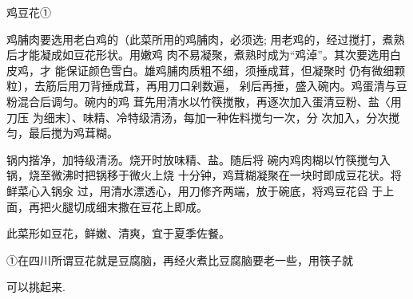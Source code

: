 \begin{recipe}{鸡豆花①}

\ingredients


\cooking

\step 鸡脯肉要选用老白鸡的（此菜所用的鸡脯肉，必须选; 用老鸡的，经过搅打，煮熟后才能凝成如豆花形状。用嫩鸡 肉不易凝聚，煮熟时成为“鸡淖”。其次要选用白皮鸡，才 能保证颜色雪白。雄鸡脯肉质粗不细，须捶成茸，但凝聚时 仍有微细颗粒〕，去筋后用刀背捶成茸，再用刀口剁数遍， 剁后再捶，盛入碗内。鸡蛋清与豆粉混合后调匀。碗内的鸡 茸先用清水以竹筷搅散，再逐次加入蛋清豆粉、盐〈用刀压 为细末〕、味精、冷特级清汤，每加一种佐料搅匀一次，分 次加入，分次搅匀，最后搅为鸡茸糊。

\step 锅内揩净，加特级清汤。烧开时放味精、盐。随后将 碗内鸡肉糊以竹筷搅勻入锅，烧至微沸时把锅移于微火上烧 十分钟，鸡茸糊凝聚在一块时即成豆花状。将鲜菜心入锅汆 过，用清水漂透心，用刀修齐两端，放于碗底，将鸡豆花舀 于上面，再把火腿切成细末撒在豆花上即成。

\notes

此菜形如豆花，鲜嫩、清爽，宜于夏季佐餐。

①在四川所谓豆花就是豆腐脑，再经火煮比豆腐脑要老一些，用筷子就

可以挑起来.

\end{recipe}

